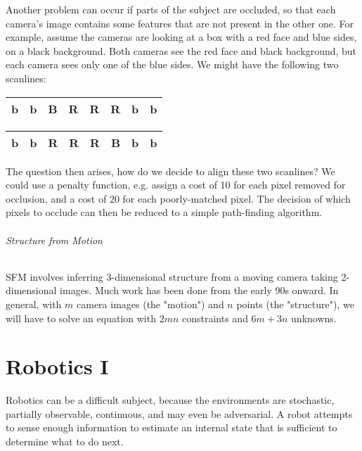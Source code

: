 \documentclass[10pt,a4paper]{article}
\begin{document}
Another problem can occur if parts of the subject are occluded, so that each camera's image contains some features that are not present in the other one. For example, assume the cameras are looking at a box with a red face and blue sides, on a black background. Both cameras see the red face and black background, but each camera sees only one of the blue sides. We might have the following two scanlines:
\begin{center}
\begin{tabular}{|c|c|c|c|c|c|c|c|}
\hline
b & b & \color{blue} B & \color{red} R & \color{red} R & \color{red} R & b & b \\
\hline
\end{tabular}

\begin{tabular}{|c|c|c|c|c|c|c|c|}
\hline
b & b & \color{red} R & \color{red} R & \color{red} R & \color{blue} B & b & b \\
\hline
\end{tabular}
\end{center}
The question then arises, how do we decide to align these two scanlines? We could use a penalty function, e.g. assign a cost of 10 for each pixel removed for occlusion, and a cost of 20 for each poorly-matched pixel. The decision of which pixels to occlude can then be reduced to a simple path-finding algorithm.

\paragraph{Structure from Motion}

SFM involves inferring 3-dimensional structure from a moving camera taking 2-dimensional images. Much work has been done from the early 90s onward. In general, with $m$ camera images (the "motion") and $n$ points (the "structure"), we will have to solve an equation with $2mn$ constraints and $6m + 3n$ unknowns.


\part{Robotics I}

Robotics can be a difficult subject, because the environments are stochastic, partially observable, continuous, and may even be adversarial. A robot attempts to sense enough information to estimate an internal state that is sufficient to determine what to do next.
\end{document}
